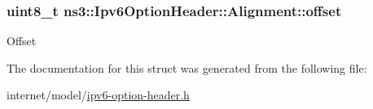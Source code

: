 \subsubsection[{\texorpdfstring{offset}{offset}}]{\setlength{\rightskip}{0pt plus 5cm}uint8\+\_\+t ns3\+::\+Ipv6\+Option\+Header\+::\+Alignment\+::offset}\hypertarget{structns3_1_1Ipv6OptionHeader_1_1Alignment_aa014078f0a72ae0984012aae7552133b}{}\label{structns3_1_1Ipv6OptionHeader_1_1Alignment_aa014078f0a72ae0984012aae7552133b}
Offset 

The documentation for this struct was generated from the following file\+:\begin{DoxyCompactItemize}
\item 
internet/model/\hyperlink{ipv6-option-header_8h}{ipv6-\/option-\/header.\+h}\end{DoxyCompactItemize}
